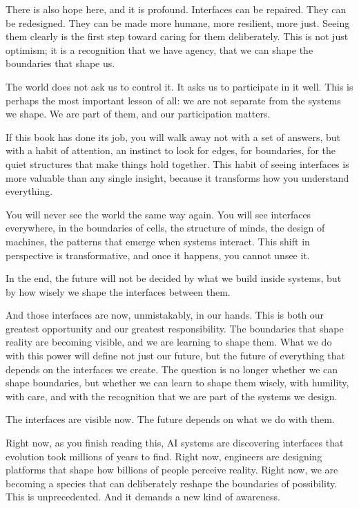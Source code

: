 \documentclass[
  openright]{book}
\begin{document}
There is also hope here, and it is profound. Interfaces can be repaired.
They can be redesigned. They can be made more humane, more resilient,
more just. Seeing them clearly is the first step toward caring for them
deliberately. This is not just optimism; it is a recognition that we
have agency, that we can shape the boundaries that shape us.

The world does not ask us to control it. It asks us to participate in it
well. This is perhaps the most important lesson of all: we are not
separate from the systems we shape. We are part of them, and our
participation matters.

If this book has done its job, you will walk away not with a set of
answers, but with a habit of attention, an instinct to look for edges,
for boundaries, for the quiet structures that make things hold together.
This habit of seeing interfaces is more valuable than any single
insight, because it transforms how you understand everything.

You will never see the world the same way again. You will see interfaces
everywhere, in the boundaries of cells, the structure of minds, the
design of machines, the patterns that emerge when systems interact. This
shift in perspective is transformative, and once it happens, you cannot
unsee it.

In the end, the future will not be decided by what we build inside
systems, but by how wisely we shape the interfaces between them.

And those interfaces are now, unmistakably, in our hands. This is both
our greatest opportunity and our greatest responsibility. The boundaries
that shape reality are becoming visible, and we are learning to shape
them. What we do with this power will define not just our future, but
the future of everything that depends on the interfaces we create. The
question is no longer whether we can shape boundaries, but whether we
can learn to shape them wisely, with humility, with care, and with the
recognition that we are part of the systems we design.

The interfaces are visible now. The future depends on what we do with
them.

Right now, as you finish reading this, AI systems are discovering
interfaces that evolution took millions of years to find. Right now,
engineers are designing platforms that shape how billions of people
perceive reality. Right now, we are becoming a species that can
deliberately reshape the boundaries of possibility. This is
unprecedented. And it demands a new kind of awareness.
\end{document}
